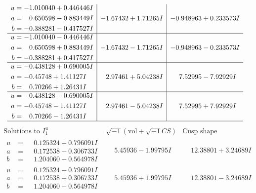 \documentclass[1p]{elsarticle_modified}
\theoremstyle{definition}
\newcommand{\I}{\sqrt{-1}}
\begin{document}
$$\begin{array}{c|c|c}
\begin{aligned}
u &= -1.010040 + 0.446446 I \\
a &= \phantom{-}0.650598 - 0.883449 I \\
b &= -0.388281 - 0.417527 I\end{aligned}
 & -1.67432 + 1.71265 I & -0.948963 + 0.233573 I \\ \hline\begin{aligned}
u &= -1.010040 - 0.446446 I \\
a &= \phantom{-}0.650598 + 0.883449 I \\
b &= -0.388281 + 0.417527 I\end{aligned}
 & -1.67432 - 1.71265 I & -0.948963 - 0.233573 I \\ \hline\begin{aligned}
u &= -0.438128 + 0.690005 I \\
a &= -0.45748 + 1.41127 I \\
b &= \phantom{-}0.70266 + 1.26431 I\end{aligned}
 & \phantom{-}2.97461 + 5.04238 I & \phantom{-}7.52995 - 7.92929 I \\ \hline\begin{aligned}
u &= -0.438128 - 0.690005 I \\
a &= -0.45748 - 1.41127 I \\
b &= \phantom{-}0.70266 - 1.26431 I\end{aligned}
 & \phantom{-}2.97461 - 5.04238 I & \phantom{-}7.52995 + 7.92929 I\\
 \hline 
 \end{array}$$\newpage$$\begin{array}{c|c|c}  
\text{Solutions to }I^u_{1}& \I (\text{vol} + \sqrt{-1}CS) & \text{Cusp shape}\\
 \hline 
\begin{aligned}
u &= \phantom{-}0.125324 + 0.796091 I \\
a &= \phantom{-}0.172538 - 0.306733 I \\
b &= \phantom{-}1.204060 - 0.564978 I\end{aligned}
 & \phantom{-}5.45936 - 1.99795 I & \phantom{-}12.38801 + 3.24689 I \\ \hline\begin{aligned}
u &= \phantom{-}0.125324 - 0.796091 I \\
a &= \phantom{-}0.172538 + 0.306733 I \\
b &= \phantom{-}1.204060 + 0.564978 I\end{aligned}
 & \phantom{-}5.45936 + 1.99795 I & \phantom{-}12.38801 - 3.24689 I \\ \hline\begin{aligned}

\end{aligned}
\end{array}$$
\end{document}

